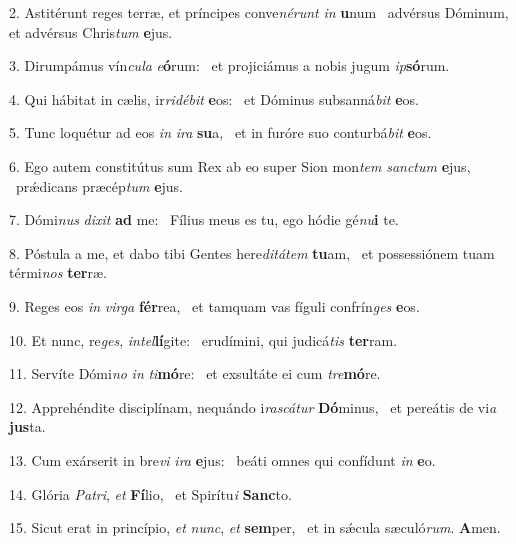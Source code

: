 2. Astitérunt reges terræ, et príncipes conve\textit{né}\textit{runt} \textit{in} \textbf{u}num \ast\  advérsus Dóminum, et advérsus Chris\textit{tum} \textbf{e}jus.\

3. Dirumpámus vín\textit{cu}\textit{la} \textit{e}\textbf{ó}rum: \ast\  et projiciámus a nobis jugum \textit{ip}\textbf{só}rum.\

4. Qui hábitat in cælis, ir\textit{ri}\textit{dé}\textit{bit} \textbf{e}os: \ast\  et Dóminus subsanná\textit{bit} \textbf{e}os.\

5. Tunc loquétur ad eos \textit{in} \textit{i}\textit{ra} \textbf{su}a, \ast\  et in furóre suo conturbá\textit{bit} \textbf{e}os.\

6. Ego autem constitútus sum Rex ab eo super Sion mon\textit{tem} \textit{sanc}\textit{tum} \textbf{e}jus, \ast\  prǽdicans præcép\textit{tum} \textbf{e}jus.\

7. Dómi\textit{nus} \textit{di}\textit{xit} \textbf{ad} me: \ast\  Fílius meus es tu, ego hódie gé\textit{nu}\textbf{i} te.\

8. Póstula a me, et dabo tibi Gentes here\textit{di}\textit{tá}\textit{tem} \textbf{tu}am, \ast\  et possessiónem tuam térmi\textit{nos} \textbf{ter}ræ.\

9. Reges eos \textit{in} \textit{vir}\textit{ga} \textbf{fér}rea, \ast\  et tamquam vas fíguli confrín\textit{ges} \textbf{e}os.\

10. Et nunc, re\textit{ges}, \textit{in}\textit{tel}\textbf{lí}gite: \ast\  erudímini, qui judicá\textit{tis} \textbf{ter}ram.\

11. Servíte Dómi\textit{no} \textit{in} \textit{ti}\textbf{mó}re: \ast\  et exsultáte ei cum \textit{tre}\textbf{mó}re.\

12. Apprehéndite disciplínam, nequándo i\textit{ras}\textit{cá}\textit{tur} \textbf{Dó}minus, \ast\  et pereátis de vi\textit{a} \textbf{jus}ta.\

13. Cum exárserit in bre\textit{vi} \textit{i}\textit{ra} \textbf{e}jus: \ast\  beáti omnes qui confídunt \textit{in} \textbf{e}o.\

14. Glória \textit{Pa}\textit{tri}, \textit{et} \textbf{Fí}lio, \ast\  et Spirítu\textit{i} \textbf{Sanc}to.\

15. Sicut erat in princípio, \textit{et} \textit{nunc}, \textit{et} \textbf{sem}per, \ast\  et in sǽcula sæculó\textit{rum}. \textbf{A}men.\

